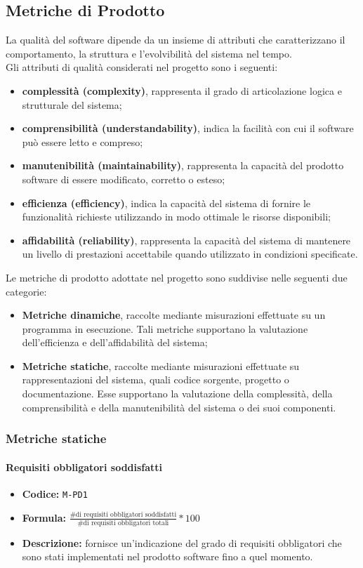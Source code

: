 \documentclass[a4paper,12pt]{article}
\begin{document}
\subsection{Metriche di Prodotto}
La qualità del software dipende da un insieme di attributi che caratterizzano il comportamento, la struttura e l’evolvibilità del sistema nel tempo.\\
Gli attributi di qualità considerati nel progetto sono i seguenti:
\begin{itemize}
    \item \textbf{complessità (complexity)}, rappresenta il grado di articolazione logica e strutturale del sistema;
    \item \textbf{comprensibilità (understandability)}, indica la facilità con cui il software può essere letto e compreso;
    \item \textbf{manutenibilità (maintainability)}, rappresenta la capacità del prodotto software di essere modificato, corretto o esteso;
    \item \textbf{efficienza (efficiency)}, indica la capacità del sistema di fornire le funzionalità richieste utilizzando in modo ottimale le risorse disponibili;
    \item \textbf{affidabilità (reliability)}, rappresenta la capacità del sistema di mantenere un livello di prestazioni accettabile quando utilizzato in condizioni specificate.
\end{itemize}
Le metriche di prodotto adottate nel progetto sono suddivise nelle seguenti due categorie:
\begin{itemize}
    \item \textbf{Metriche dinamiche}, raccolte mediante misurazioni effettuate su un programma in esecuzione. Tali metriche supportano la valutazione dell’efficienza e dell’affidabilità del sistema;
    \item \textbf{Metriche statiche}, raccolte mediante misurazioni effettuate su rappresentazioni del sistema, quali codice sorgente, progetto o documentazione. Esse supportano la valutazione della complessità, della comprensibilità e della manutenibilità del sistema o dei suoi componenti.
\end{itemize}

\subsubsection{Metriche statiche}

\paragraph{Requisiti obbligatori soddisfatti}
\begin{itemize}
    \item \textbf{Codice:} \texttt{M-PD1}
    \item \textbf{Formula:} $\frac{\text{\# di requisiti obbligatori soddisfatti}}{\text{\# di requisiti obbligatori totali}}*100$
    \item \textbf{Descrizione:} fornisce un'indicazione del grado di requisiti obbligatori che sono stati implementati nel prodotto software fino a quel momento.
\end{itemize}
\end{document}
